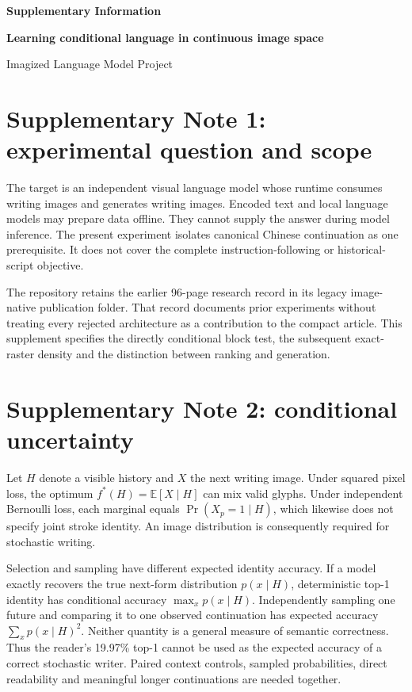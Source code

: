 \documentclass[10pt,a4paper]{article}
\begin{document}
\renewcommand{\thefigure}{S\arabic{figure}}
{\sffamily\bfseries\Large Supplementary Information\par}
\medskip\noindent\textbf{Learning conditional language in continuous image space}\par
\medskip\noindent Imagized Language Model Project

\section*{Supplementary Note 1: experimental question and scope}
The target is an independent visual language model whose runtime consumes
writing images and generates writing images. Encoded text and local language
models may prepare data offline. They cannot supply the answer during model
inference. The present experiment isolates canonical Chinese continuation as
one prerequisite. It does not cover the complete instruction-following or
historical-script objective.

The repository retains the earlier 96-page research record in its legacy
image-native publication folder. That record documents prior
experiments without treating every rejected architecture as a contribution to
the compact article. This supplement specifies the directly conditional
block test, the subsequent exact-raster density and the distinction between
ranking and generation.

\section*{Supplementary Note 2: conditional uncertainty}
Let $H$ denote a visible history and $X$ the next writing image. Under squared
pixel loss, the optimum $f^*(H)=\mathbb{E}[X\mid H]$ can mix valid glyphs.
Under independent Bernoulli loss, each marginal equals
$\Pr(X_p=1\mid H)$, which likewise does not specify joint stroke identity.
An image distribution is consequently required for stochastic writing.

Selection and sampling have different expected identity accuracy. If a
model exactly recovers the true next-form distribution $p(x\mid H)$,
deterministic top-1 identity has conditional accuracy
$\max_x p(x\mid H)$. Independently sampling one future and comparing it to
one observed continuation has expected accuracy $\sum_x p(x\mid H)^2$.
Neither quantity is a general measure of semantic correctness. Thus the
reader's 19.97\% top-1 cannot be used as the expected accuracy of a correct
stochastic writer. Paired context controls, sampled probabilities, direct
readability and meaningful longer continuations are needed together.
\end{document}
